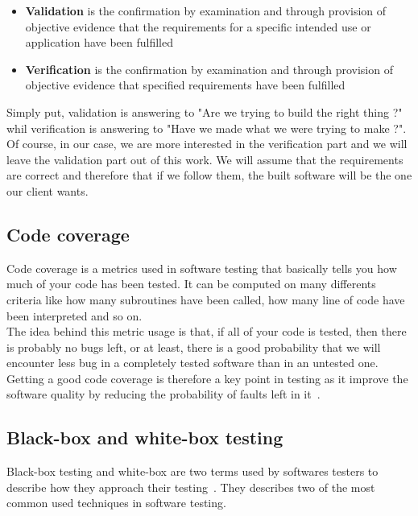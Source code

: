 \documentclass[12pt]{article}
\begin{document}
\begin{itemize}

\item \textbf{Validation} is the confirmation by examination and through provision of objective evidence that the requirements for a specific intended use or application have been fulfilled~\cite{IEEEStd1990}
\item \textbf{Verification} is the confirmation by examination and through provision of objective evidence that specified requirements have been fulfilled~\cite{IEEEStd1990}

\end{itemize}

Simply put, validation is answering to "Are we trying to build the right thing ?" whil verification is answering to "Have we made what we were trying to make ?". Of course, in our case, we are more interested in the verification part and we will leave the validation part out of this work. We will assume that the requirements are correct and therefore that if we follow them, the built software will be the one our client wants.

\subsection{Code coverage}

Code coverage is a metrics used in software testing that basically tells you how much of your code has been tested. It can be computed on many differents criteria like how many subroutines have been called, how many line of code have been interpreted and so on.\\

The idea behind this metric usage is that, if all of your code is tested, then there is probably no bugs left, or at least, there is a good probability that we will encounter less bug in a completely tested software than in an untested one. Getting a good code coverage is therefore a key point in testing as it improve the software quality by reducing the probability of faults left in it~\cite{TestingForContinuousDelivery:2016}.

\subsection{Black-box and white-box testing}

Black-box testing and white-box are two terms used by softwares testers to describe how they approach their testing~\cite{Patton:2005}. They describes two of the most common used techniques in software testing.
\end{document}
